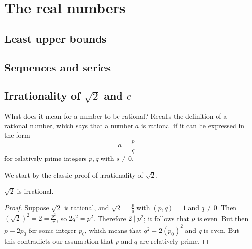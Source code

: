 \documentclass[main.tex]{subfiles}
\begin{document}
	\section{The real numbers}
		\subsection{Least upper bounds}
		
		\subsection{Sequences and series}
		
		\subsection{Irrationality of $\sqrt{2}$ and $e$}
		What does it mean for a number to be rational? Recalls the definition of a rational number, which says that a number $a$ is rational if it can be expressed in the form
		\begin{equation*}
			a = \frac{p}{q}
		\end{equation*}
		for relatively prime integers $p, q$ with $q \neq 0$.
		
		We start by the classic proof of irrationality of $\sqrt{2}$.
		\begin{theorem}
			$\sqrt{2}$ is irrational.
		\end{theorem}
		\begin{proof}
			Suppose $\sqrt{2}$ is rational, and $\sqrt{2} = \frac{p}{q}$ with $(p, q) = 1$ and $q \neq 0$. Then $(\sqrt{2})^2 = 2 = \frac{p^2}{q^2}$, so $2q^2 = p^2$. Therefore $2 \mid p^2$; it follows that $p$ is even. But then $p = 2p_0$ for some integer $p_0$, which means that $q^2 = 2{(p_0)}^2$ and $q$ is even. But this contradicts our assumption that $p$ and $q$ are relatively prime.
		\end{proof}
	
\end{document}

